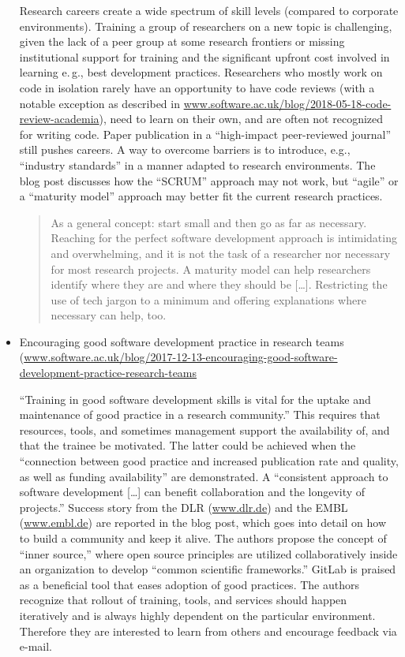 \documentclass[11pt,letterpaper]{article}
\begin{document}
\begin{itemize}
\noindent Research careers create a wide spectrum of skill levels (compared to corporate environments). Training a group of researchers on a new topic is challenging, given the lack of a peer group at some research frontiers or missing institutional support for training and the significant upfront cost involved in learning e.\,g., best development practices. Researchers who mostly work on code in isolation rarely have an opportunity to have code reviews (with a notable exception as described in \href{https://www.software.ac.uk/blog/2018-05-18-code-review-academia}{www.software.ac.uk/blog/2018-05-18-code-review-academia}), need to learn on their own, and are often not recognized for writing code. Paper publication in a ``high-impact peer-reviewed journal'' still pushes careers. A way to overcome barriers is to introduce, e.g., ``industry standards'' in a manner adapted to research environments. The blog post discusses how the ``SCRUM'' approach may not work, but ``agile'' or a ``maturity model'' approach may better fit the current research practices.
\begin{quote}
As a general concept: start small and then go as far as necessary. Reaching for the perfect software development approach is intimidating and overwhelming, and it is not the task of a researcher nor necessary for most research projects. A maturity model can help researchers identify where they are and where they should be [\ldots]. Restricting the use of tech jargon to a minimum and offering explanations where necessary can help, too.
\end{quote}


\item Encouraging good software development practice in research teams (\href{https://www.software.ac.uk/blog/2017-12-13-encouraging-good-software-development-practice-research-teams}{www.software.ac.uk/blog/2017-12-13-encouraging-good-software-development-practice-research-teams}

\noindent ``Training in good software development skills is vital for the uptake and maintenance of good practice in a research community.'' This requires that resources, tools, and sometimes management support the availability of, and that the trainee be motivated. The latter could be achieved when the ``connection between good practice and increased publication rate and quality, as well as funding availability'' are demonstrated. A ``consistent approach to software development [\ldots] can benefit collaboration and the longevity of projects.'' Success story from the DLR (\href{https://www.dlr.de}{www.dlr.de}) and the EMBL (\href{https://www.embl.de/}{www.embl.de}) are reported in the blog post, which goes into detail on how to build a community and keep it alive. The authors propose the concept of ``inner source,'' where open source principles are utilized collaboratively inside an organization to develop ``common scientific frameworks.'' GitLab is praised as a beneficial tool that eases adoption of good practices. The authors recognize that rollout of training, tools, and services should happen iteratively and is always highly dependent on the particular environment. Therefore they are interested to learn from others and encourage feedback via e-mail.


\end{itemize}
\end{document}

